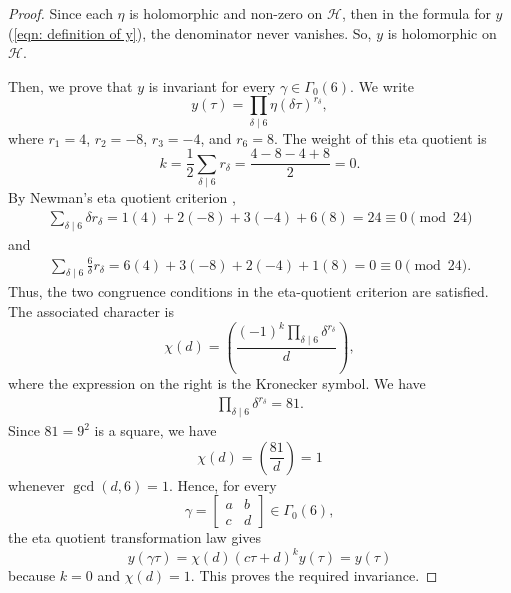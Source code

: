 \documentclass[12pt, a4paper]{amsart}
\theoremstyle{definition}
\numberwithin{theorem}{section}
\begin{document}
\begin{proof}
Since each $\eta$ is holomorphic and non-zero on $\mathcal{H}$, then in the formula for $y$ (\ref{eqn: definition of y}), the denominator never vanishes. So, $y$ is holomorphic on $\mathcal{H}$. 

Then, we prove that $y$ is invariant for every $\gamma\in \Gamma_0\left(6\right)$. We write \[y\left(\tau\right)=\prod_{\delta\mid 6}\eta\left(\delta \tau\right)^{r_\delta},\]
where $r_1=4$, $r_2=-8$, $r_3=-4$, and $r_6=8$. The weight of this eta quotient is \[k=\frac{1}{2}\sum_{\delta\mid 6}r_\delta=\frac{4-8-4+8}{2}=0.\]
By Newman's eta quotient criterion \cite{RouseWebb2015},
\begin{align*}
\sum_{\delta\mid 6}\delta r_\delta=1\left(4\right)+2\left(-8\right)+3\left(-4\right)+6\left(8\right)=24\equiv 0\pmod{24}
\end{align*}
and
\begin{align*}
\sum_{\delta\mid 6}\frac{6}{\delta}r_\delta=6\left(4\right)+3\left(-8\right)+2\left(-4\right)+1\left(8\right)=0\equiv 0\pmod{24}.
\end{align*}
Thus, the two congruence conditions in the eta-quotient criterion are satisfied. The associated character is
\[\chi\left(d\right)=\left(\frac{(-1)^k\prod_{\delta\mid 6}\delta^{r_\delta}}{d}\right),
\]
where the expression on the right is the Kronecker symbol. We have
\begin{align*}
\prod_{\delta\mid 6}\delta^{r_\delta}=81.
\end{align*}
Since \(81=9^2\) is a square, we have
\[\chi\left(d\right)=\left(\frac{81}{d}\right)=1\]
whenever \(\gcd\left(d,6\right)=1\). Hence, for every
\[\gamma=
\begin{bmatrix}
a&b\\
c&d
\end{bmatrix}\in\Gamma_0\left(6\right),
\]
the eta quotient transformation law gives
\[y\left(\gamma\tau\right)=\chi\left(d\right)\left(c\tau+d\right)^k y\left(\tau\right)=y\left(\tau\right)\]
because \(k=0\) and \(\chi\left(d\right)=1\). This proves the required invariance.


\end{proof}
\end{document}
